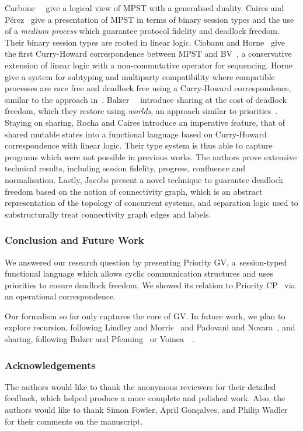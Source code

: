 Carbone~\etal~\cite{CarboneMSY15,carbonelindley16} give a logical view of MPST with a generalised duality.
Caires and P\'{e}rez~\cite{CairesP16} give a presentation of MPST in terms of binary session types and the use of a \emph{medium process} which guarantee protocol fidelity and deadlock freedom. Their binary session types are rooted in linear logic.
Ciobanu and Horne~\cite{CiobanuH15} give the first Curry-Howard correspondence between MPST and BV~\cite{Guglielmi07}, a conservative extension of linear logic with a non-commutative operator for sequencing.
Horne~\cite{Horne20} give a system for subtyping and multiparty compatibility where compatible processes are race free and deadlock free using a Curry-Howard correspondence, similar to the approach in~\cite{CiobanuH15}.
Balzer~\etal~\cite{balzerpfenning17} introduce sharing at the cost of deadlock freedom, which they restore using \emph{worlds}, an approach similar to priorities~\cite{balzertoninho19}.
Staying on sharing, Rocha and Caires \cite{rochacaires21} introduce an imperative feature, that of shared mutable states into a functional language based on Curry-Howard correspondence with linear logic. Their type system is thus able to capture programs which were not possible in previous works. The authors prove extensive technical results, including session fidelity, progress, confluence and
normalisation.
Lastly, Jacobs \etal \cite{JacobsBK22a} present a novel technique to guarantee deadlock freedom based on the notion of connectivity graph, which is an abstract representation of the topology of concurrent systems, and separation logic used to substructurally treat connectivity graph edges and labels.


\subsubsection*{Conclusion and Future Work}
We answered our research question by presenting Priority GV, a~session-typed functional language which allows cyclic communication structures and uses priorities to ensure deadlock freedom. We showed its relation to Priority CP~\cite{dardhagay18extended} via an operational correspondence.

Our formalism so far only captures the core of GV. In future work, we plan to explore recursion, following Lindley and Morris~\cite{lindleymorris16} and Padovani and Novara~\cite{padovaninovara15}, and sharing, following Balzer and Pfenning~\cite{balzerpfenning17} or Voinea~\etal~\cite{VoineaDG19}.

\subsubsection*{Acknowledgements}
The authors would like to thank the anonymous reviewers for their detailed feedback, which helped produce a more complete and polished work.
Also, the authors would like to thank Simon Fowler, April Gon\c{c}alves, and Philip Wadler for their comments on the manuscript.
